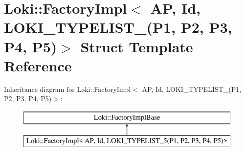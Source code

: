 \hypertarget{structLoki_1_1FactoryImpl_3_01AP_00_01Id_00_01LOKI__TYPELIST__5_07P1_00_01P2_00_01P3_00_01P4_00_01P5_08_4}{}\section{Loki\+:\+:Factory\+Impl$<$ A\+P, Id, L\+O\+K\+I\+\_\+\+T\+Y\+P\+E\+L\+I\+S\+T\+\_(P1, P2, P3, P4, P5)$>$ Struct Template Reference}
\label{structLoki_1_1FactoryImpl_3_01AP_00_01Id_00_01LOKI__TYPELIST__5_07P1_00_01P2_00_01P3_00_01P4_00_01P5_08_4}
Inheritance diagram for Loki\+:\+:Factory\+Impl$<$ A\+P, Id, L\+O\+K\+I\+\_\+\+T\+Y\+P\+E\+L\+I\+S\+T\+\_(P1, P2, P3, P4, P5)$>$\+:\begin{figure}[H]
\begin{center}
\leavevmode
\includegraphics[height=2.000000cm]{structLoki_1_1FactoryImpl_3_01AP_00_01Id_00_01LOKI__TYPELIST__5_07P1_00_01P2_00_01P3_00_01P4_00_01P5_08_4}
\end{center}
\end{figure}
